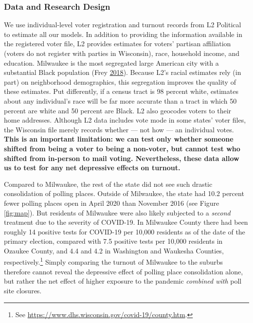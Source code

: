 \documentclass[
  12pt,
]{article}
\begin{document}
\hypertarget{data-and-research-design}{%
\subsubsection*{Data and Research Design}\label{data-and-research-design}}

We use individual-level voter registration and turnout records from L2 Political to estimate all our models. In addition to providing the information available in the registered voter file, L2 provides estimates for voters' partisan affiliation (voters do not register with parties in Wisconsin), race, household income, and education. Milwaukee is the most segregated large American city with a substantial Black population (Frey \protect\hyperlink{ref-Frey2018}{2018}). Because L2's racial estimates rely (in part) on neighborhood demographics, this segregation improves the quality of these estimates. Put differently, if a census tract is 98 percent white, estimates about any individual's race will be far more accurate than a tract in which 50 percent are white and 50 percent are Black. L2 also geocodes voters to their home addresses. Although L2 data includes vote mode in some states' voter files, the Wisconsin file merely records whether --- not how --- an individual votes. \textbf{This is an important limitation: we can test only whether someone shifted from being a voter to being a non-voter, but cannot test who shifted from in-person to mail voting. Nevertheless, these data allow us to test for any net depressive effects on turnout.}

Compared to Milwaukee, the rest of the state did not see such drastic consolidation of polling places. Outside of Milwaukee, the state had 10.2 percent fewer polling places open in April 2020 than November 2016 (see Figure \ref{fig:map}). But residents of Milwaukee were also likely subjected to a \emph{second} treatment due to the severity of COVID-19. In Milwaukee County there had been roughly 14 positive tests for COVID-19 per 10,000 residents as of the date of the primary election, compared with 7.5 positive tests per 10,000 residents in Ozaukee County, and 4.4 and 4.2 in Washington and Waukesha Counties, respectively.\footnote{See \url{https://www.dhs.wisconsin.gov/covid-19/county.htm}.} Simply comparing the turnout of Milwaukee to the suburbs therefore cannot reveal the depressive effect of polling place consolidation alone, but rather the net effect of higher exposure to the pandemic \emph{combined with} poll site closures.
\end{document}
